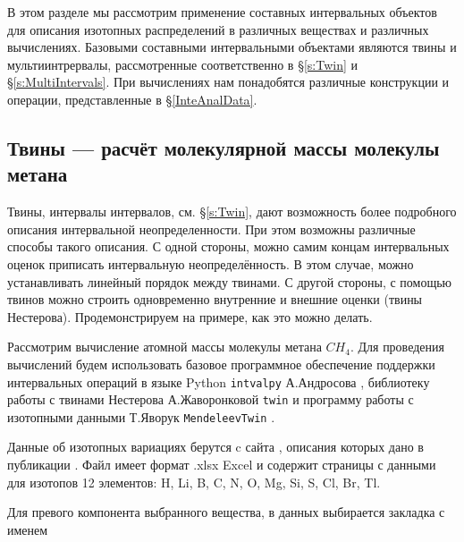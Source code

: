 \documentclass[a5paper,openany]{book}
\begin{document}
В этом разделе мы рассмотрим применение составных интервальных объектов для описания изотопных распределений в различных веществах и различных вычислениях.
Базовыми составными интервальными объектами являются твины и мультиинтрервалы, рассмотренные соответственно в \S\ref{s:Twin} и \S\ref{s:MultiIntervals}.
При вычислениях нам понадобятся различные конструкции и операции, представленные  в \S\ref{InteAnalData}.

\subsection{Твины --- расчёт молекулярной массы молекулы метана}

Твины, интервалы интервалов, см. \S\ref{s:Twin}, дают возможность более подробного описания интервальной неопределенности. При этом возможны различные способы такого описания.
С одной стороны, можно самим концам интервальных оценок приписать интервальную неопределённость. В этом  случае, можно устанавливать линейный порядок между твинами. 
С другой стороны, с помощью твинов можно строить одновременно внутренние и внешние оценки (твины Нестерова). Продемонстрируем на примере, как это можно делать.

Рассмотрим вычисление атомной массы молекулы метана $CH_4$. Для проведения вычислений будем использовать базовое программное обеспечение поддержки интервальных операций в языке Python  {\tt intvalpy} А.Андросова \cite{intvalpy},
библиотеку работы с твинами Нестерова А.Жаворонковой {\tt twin} \cite{PythonTwin} и
программу работы с изотопными данными Т.Яворук {\tt MendeleevTwin} \cite{MendeleevTwin}.

Данные об изотопных вариациях берутся c сайта \cite{IsotopeData2018}, описания которых дано в публикации \cite{IUPACTables}.
Файл имеет формат .xlsx Excel и содержит страницы с данными для изотопов 12  элементов:
H, Li, B, C, N, O, Mg, Si, S, Cl, Br, Tl.

Для превого компонента выбранного вещества, в данных выбирается закладка с именем 
\end{document}
